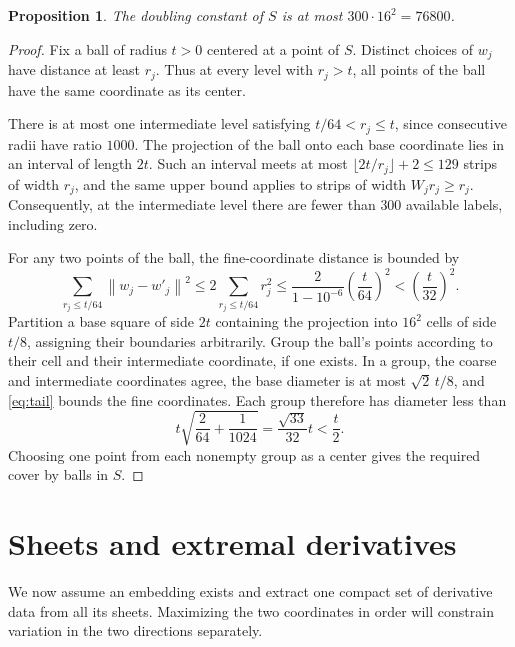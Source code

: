\documentclass[11pt]{article}
\newtheorem{proposition}[theorem]{Proposition}
\newcommand{\norm}[1]{\left\lVert#1\right\rVert}
\begin{document}
\begin{proposition}\label{prop:doubling}
The doubling constant of $S$ is at most $300\cdot16^2=76800$.
\end{proposition}
\begin{proof}
Fix a ball of radius $t>0$ centered at a point of $S$. Distinct choices of $w_j$ have distance at least $r_j$. Thus at every level with $r_j>t$, all points of the ball have the same coordinate as its center.

There is at most one intermediate level satisfying $t/64<r_j\le t$, since consecutive radii have ratio $1000$. The projection of the ball onto each base coordinate lies in an interval of length $2t$. Such an interval meets at most $\lfloor2t/r_j\rfloor+2\le129$ strips of width $r_j$, and the same upper bound applies to strips of width $W_jr_j\ge r_j$. Consequently, at the intermediate level there are fewer than $300$ available labels, including zero.

For any two points of the ball, the fine-coordinate distance is bounded by
\begin{equation}\label{eq:tail}
 \sum_{r_j\le t/64}\norm{w_j-w'_j}^2
 \le 2\sum_{r_j\le t/64}r_j^2
 \le\frac{2}{1-10^{-6}}\left(\frac{t}{64}\right)^2
 <\left(\frac{t}{32}\right)^2.
\end{equation}
Partition a base square of side $2t$ containing the projection into $16^2$ cells of side $t/8$, assigning their boundaries arbitrarily. Group the ball's points according to their cell and their intermediate coordinate, if one exists. In a group, the coarse and intermediate coordinates agree, the base diameter is at most $\sqrt2\,t/8$, and \eqref{eq:tail} bounds the fine coordinates. Each group therefore has diameter less than
\[
 t\sqrt{\frac{2}{64}+\frac{1}{1024}}=\frac{\sqrt{33}}{32}t<\frac t2.
\]
Choosing one point from each nonempty group as a center gives the required cover by balls in $S$.
\end{proof}

\section{Sheets and extremal derivatives}
\label{sec:extrema}
We now assume an embedding exists and extract one compact set of derivative data from all its sheets. Maximizing the two coordinates in order will constrain variation in the two directions separately.
\end{document}

